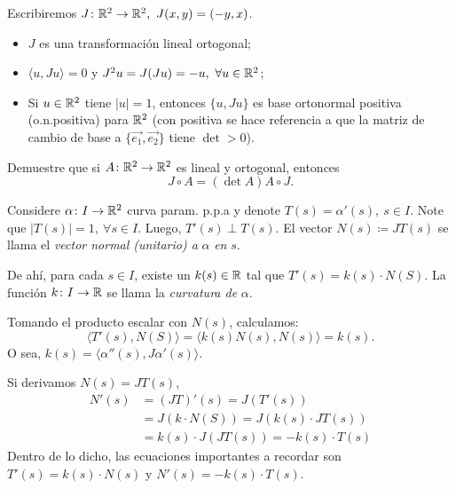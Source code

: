 \begin{notation}
	Escribiremos $J \colon \R^{2} \to \R^{2},\ J(x,y) = (-y,x)$.
	\begin{itemize}
		\item $J$ es una transformación lineal ortogonal;

		\item $\langle u, Ju \rangle = 0$ y $J^{2} u = J(Ju) = -u,\ \forall u \in \mathbb{R}^{2}$;

		\item Si $u \in \mathbb{R}^{2}$ tiene $|u| = 1$, entonces $\{u, Ju\}$ es base ortonormal positiva (o.n.positiva) para $\mathbb{R}^{2}$ (con positiva se hace referencia a que la matriz de cambio de base a $\{\vec{e_{1}}, \vec{e_{2}}\}$ tiene $\det > 0$).
	\end{itemize}
\end{notation}

\begin{ex}
	Demuestre que si $A \colon \mathbb{R}^{2} \to \mathbb{R}^{2}$ es lineal y ortogonal, entonces 
	\[ J \circ A = (\det A) A \circ J. \]
\end{ex}

\begin{definition}
	Considere $\alpha \colon I \to \mathbb{R}^{2}$ curva param. p.p.a y denote $T(s) = \alpha'(s),\ s \in I$. Note que $|T(s)| = 1,\ \forall s \in I$. Luego, $T'(s) \perp T(s)$. El vector $N(s) \coloneq JT(s)$ se llama el \textit{vector normal (unitario) a} $\alpha$ \textit{en} $s$. \par
	De ahí, para cada $s \in I$, existe un $k(s) \in \mathbb{R}$ tal que $T'(s) = k(s) \cdot N(S)$. La función $k \colon I \to \mathbb{R}$ se llama la \textit{curvatura de} $\alpha$.
\end{definition}

\begin{note}
	Tomando el producto escalar con $N(s)$, calculamos:
	\[ \langle T'(s), N(S) \rangle = \langle k(s) N(s), N(s) \rangle = k(s). \]
	O sea, $k(s) = \langle \alpha''(s), J \alpha'(s) \rangle$. \par
	Si derivamos $N(s) = JT(s)$,
	\begin{align*}
		N'(s) &= (JT)'(s) = J(T'(s)) \\
		&= J(k \cdot N(S)) = J(k(s) \cdot JT(s)) \\
		&= k(s) \cdot J(JT(s)) = -k(s) \cdot T(s)
	\end{align*}
	Dentro de lo dicho, las ecuaciones importantes a recordar son $T'(s) = k(s) \cdot N(s)$ y $N'(s) = -k(s) \cdot T(s)$.
\end{note}

